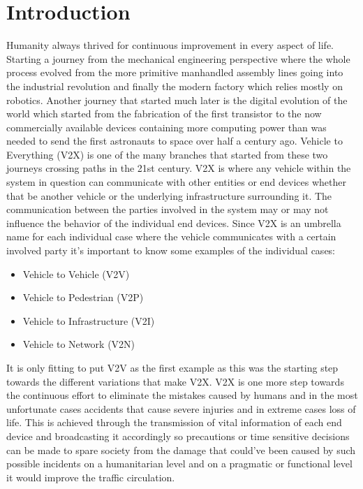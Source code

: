 \chapter{Introduction}
Humanity always thrived for continuous improvement in every aspect of life. Starting a journey from the mechanical engineering perspective where the whole process evolved from the more primitive manhandled assembly lines going into the industrial revolution and finally the modern factory which relies mostly on robotics. Another journey that started much later is the digital evolution of the world which started from the fabrication of the first transistor to the now commercially available devices containing more computing power than was needed to send the first astronauts to space over half a century ago.\newline
Vehicle to Everything (V2X) is one of the many branches that started from these two journeys crossing paths in the 21st century. V2X is where any vehicle within the system in question can communicate with other entities or end devices whether that be another vehicle or the underlying infrastructure surrounding it. The communication between the parties involved in the system may or may not influence the behavior of the individual end devices.\newline
Since V2X is an umbrella name for each individual case where the vehicle communicates with a certain involved party it’s important to know some examples of the individual cases:
\begin{itemize}
    \item Vehicle to Vehicle (V2V)
    \item Vehicle to Pedestrian (V2P)
    \item Vehicle to Infrastructure (V2I)
    \item Vehicle to Network (V2N)
\end{itemize}
It is only fitting to put V2V as the first example as this was the starting step towards the different variations that make V2X.\newline
V2X is one more step towards the continuous effort to eliminate the mistakes caused by humans and in the most unfortunate cases accidents that cause severe injuries and in extreme cases loss of life. This is achieved through the transmission of vital information of each end device and broadcasting it accordingly so precautions or time sensitive decisions can be made to spare society from the damage that could’ve been caused by such possible incidents on a humanitarian level and on a pragmatic or functional level it would improve the traffic circulation.
